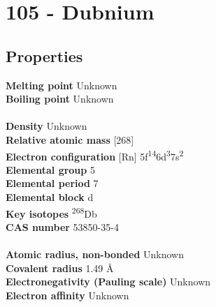 \section{105 - Dubnium}
\label{sec:elem-dubnium}
\subsection{Properties}
\textbf{Melting point} Unknown\\
\textbf{Boiling point} Unknown\\
\\
\textbf{Density} Unknown\\
\textbf{Relative atomic mass} [268]\\
\textbf{Electron configuration} [Rn] 5f\textsuperscript{14}6d\textsuperscript{3}7s\textsuperscript{2}\\
\textbf{Elemental group} 5\\
\textbf{Elemental period} 7\\
\textbf{Elemental block} d\\
\textbf{Key isotopes} \textsuperscript{268}Db\\
\textbf{CAS number} 53850-35-4\\
\\
\textbf{Atomic radius, non-bonded} Unknown\\
\textbf{Covalent radius} 1.49 Å\\
\textbf{Electronegativity (Pauling scale)} Unknown\\
\textbf{Electron affinity} Unknown\\